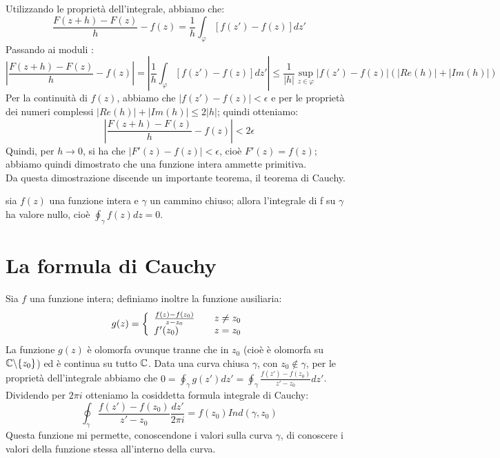 Utilizzando le proprietà dell'integrale, abbiamo che:
$$\frac{F(z+h)-F(z)}{h}-f(z)=\frac{1}{h} \int_{\varphi}[f(z')-f(z)]dz'$$
Passando ai moduli :
$$\left|\frac{F(z+h)-F(z)}{h}-f(z)\right|=\left|\frac{1}{h} \int_{\varphi}[f(z')-f(z)]dz'\right| \leq \frac{1}{|h|} \sup_{z \in \varphi} |f(z')-f(z)| (|Re(h)|+|Im(h)|)$$
Per la continuità di $f(z)$, abbiamo che $|f(z')-f(z)| < \epsilon$ e per le proprietà dei numeri complessi $|Re(h)|+|Im(h)| \leq 2|h|$; quindi otteniamo:
$$\left|\frac{F(z+h)-F(z)}{h}-f(z)\right|<2 \epsilon$$
Quindi, per $h \to 0$, si ha che $|F'(z)-f(z)|< \epsilon$, cioè $F'(z)=f(z)$; abbiamo quindi dimostrato che una funzione intera ammette primitiva.
\\
Da questa dimostrazione discende un importante teorema, il teorema di Cauchy.
\begin{teorema}
sia $f(z)$ una funzione intera e $\gamma$ un cammino chiuso; allora l'integrale di f su $\gamma$ ha valore nullo, cioè $\oint_{\gamma} f(z)dz=0$.
\end{teorema}
\section{La formula di Cauchy}

Sia $f$ una funzione intera; definiamo inoltre la funzione ausiliaria:
$$g(z)=\left\{  \begin{array}{l l}    \frac{f(z)-f(z_0)}{z-z_0} & \quad z \neq z_0\\    f'(z_0) & \quad z=z_0  \end{array} \right.$$
La funzione $g(z)$ è olomorfa ovunque tranne che in $z_0$ (cioè è olomorfa su $\mathbb{C} \backslash \{z_0\}$) ed è continua su tutto $\mathbb{C}$. Data una curva chiusa $\gamma$, con $z_0 \notin \gamma$, per le proprietà dell'integrale abbiamo che $0= \oint_{\gamma} g(z') dz'=\oint_{\gamma} \frac{f(z')-f(z_0)}{z'-z_0} dz'$. Dividendo per $2 \pi i$ otteniamo la cosiddetta formula integrale di Cauchy:
$$\oint_{\gamma} \frac{f(z')-f(z_0)}{z'-z_0} \frac{dz'}{2 \pi i} =f(z_0) Ind(\gamma, z_0)$$
Questa funzione mi permette, conoscendone i valori sulla curva $\gamma$, di conoscere i valori della funzione stessa all'interno della curva.


